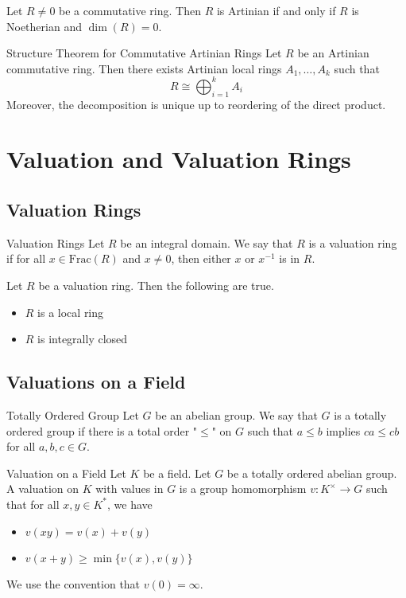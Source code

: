 \documentclass[a4paper]{article}
\begin{document}
\begin{prp}{}{} Let $R\neq 0$ be a commutative ring. Then $R$ is Artinian if and only if $R$ is Noetherian and $\dim(R)=0$. 
\end{prp}

\begin{thm}{Structure Theorem for Commutative Artinian Rings}{} Let $R$ be an Artinian commutative ring. Then there exists Artinian local rings $A_1,\dots,A_k$ such that $$R\cong\bigoplus_{i=1}^kA_i$$ Moreover, the decomposition is unique up to reordering of the direct product. 
\end{thm}

\pagebreak
\section{Valuation and Valuation Rings}
\subsection{Valuation Rings}
\begin{defn}{Valuation Rings}{} Let $R$ be an integral domain. We say that $R$ is a valuation ring if for all $x\in\text{Frac}(R)$ and $x\neq 0$, then either $x$ or $x^{-1}$ is in $R$. 
\end{defn}

\begin{lmm}{}{} Let $R$ be a valuation ring. Then the following are true. 
\begin{itemize}
\item $R$ is a local ring
\item $R$ is integrally closed
\end{itemize}
\end{lmm}

\subsection{Valuations on a Field}
\begin{defn}{Totally Ordered Group}{} Let $G$ be an abelian group. We say that $G$ is a totally ordered group if there is a total order "$\leq$" on $G$ such that $a\leq b$ implies $ca\leq cb$ for all $a,b,c\in G$. 
\end{defn}

\begin{defn}{Valuation on a Field}{} Let $K$ be a field. Let $G$ be a totally ordered abelian group. A valuation on $K$ with values in $G$ is a group homomorphism $v:K^\times\to G$ such that for all $x,y\in K^\ast$, we have 
\begin{itemize}
\item $v(xy)=v(x)+v(y)$
\item $v(x+y)\geq\min\{v(x),v(y)\}$
\end{itemize}
We use the convention that $v(0)=\infty$. 
\end{defn}
\end{document}
